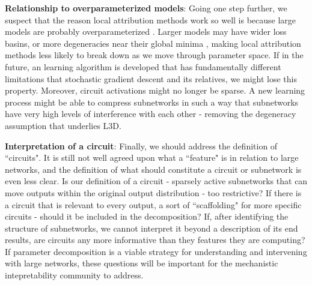 \documentclass{article}
\theoremstyle{plain}
\theoremstyle{definition}
\theoremstyle{remark}
\begin{document}
\textbf{Relationship to overparameterized models}: Going one step further, we suspect that the reason local attribution methods work so well is because large models are probably overparameterized \cite{kawaguchi2016deep,choromanska2015loss,dauphin2014identifying,soudry2017exponentially}. Larger models may have wider loss basins, or more degeneracies near their global minima \cite{keskar2016large,sagun2017empirical}, making local attribution methods less likely to break down as we move through parameter space. If in the future, an learning algorithm is developed that has fundamentally different limitations that stochastic gradient descent and its relatives, we might lose this property. Moreover, circuit activations might no longer be sparse. A new learning process might be able to compress subnetworks in such a way that subnetworks have very high levels of interference with each other - removing the degeneracy assumption that underlies L3D. 

\textbf{Interpretation of a circuit}: Finally, we should address the definition of ``circuits". It is still not well agreed upon what a ``feature" is in relation to large networks, and the definition of what should constitute a circuit or subnetwork is even less clear. Is our definition of a circuit - sparsely active subnetworks that can move outputs within the original output distribution - too restrictive? If there is a circuit that is relevant to every output, a sort of ``scaffolding" for more specific circuits - should it be included in the decomposition? If, after identifying the structure of subnetworks, we cannot interpret it beyond a description of its end results, are circuits any more informative than they features they are computing? If parameter decomposition is a viable strategy for understanding and intervening with large networks, these questions will be important for the mechanistic intepretability community to address.

\clearpage


\clearpage




\newpage
\appendix
\renewcommand{\thefigure}{S\arabic{figure}}  %
\renewcommand{\theHfigure}{S\arabic{figure}} %
\setcounter{figure}{0}  %
\onecolumn
\end{document}
